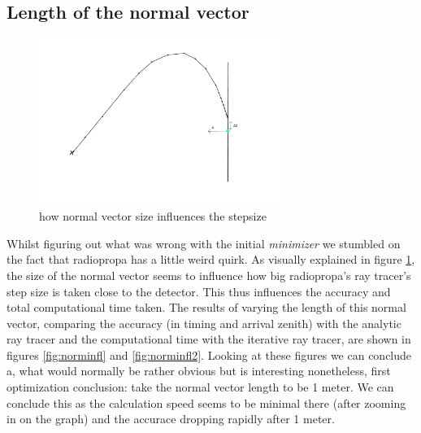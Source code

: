 \documentclass[11pt,a4paper,faculty=we,language=en,doctype=report]{cls/ugent-doc}
\begin{document}
\subsection{Length of the normal vector}
\begin{figure}
	\centering
	\includegraphics[width=0.7\textwidth]{figures/PrincipleNormIllu.pdf}
	\caption{how normal vector size influences the stepsize}
	\label{fig:normexpl}
\end{figure}
Whilst figuring out what was wrong with the initial \textit{minimizer} we
stumbled on the fact that radiopropa has a little weird quirk.  As visually
explained in figure \ref{fig:normexpl}, the size of the normal vector seems to
influence how big radiopropa's ray tracer's step size is taken close to the
detector.  This thus influences the accuracy and total computational time
taken. The results of varying the length of this normal vector, comparing the
accuracy (in timing and arrival zenith) with the analytic ray tracer and the computational time with the
iterative ray tracer, are shown in figures \ref{fig:norminfl} and
\ref{fig:norminfl2}.  Looking at these figures we can conclude a, what would
normally be rather obvious but is interesting nonetheless, first optimization
conclusion: take the normal vector length to be 1 meter.
We can conclude this as the calculation speed seems to be minimal there (after zooming
in on the graph) and the accurace dropping rapidly after 1 meter.
\end{document}
